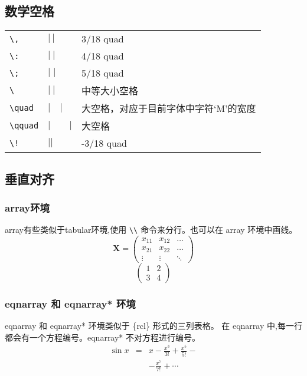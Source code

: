 \documentclass[12pt, a4paper, onecolumn, notitlepage]{article}
\begin{document}
\subsection{数学空格}
\begin{tabular}{l|l|l}
\verb-\,-     &  $|\,|$     & 3/18 quad \\
\verb-\:-     &  $|\:|$     & 4/18 quad \\
\verb-\;-     &  $|\;|$     & 5/18 quad \\
\verb*-\ -    &  $|\ |$     & 中等大小空格 \\
\verb-\quad-  &  $|\quad|$  & 大空格，对应于目前字体中字符`M'的宽度 \\
\verb-\qquad- &  $|\qquad|$ & 大空格 \\
\verb-\!-     &  $|\!|$     & -3/18 quad \\
\end{tabular}
\subsection{垂直对齐}
\subsubsection{array环境}
array有些类似于tabular环境,使用 \verb-\\- 命令来分行。也可以在 array 环境中画线。
\begin{displaymath}
\mathbf{X} =
\left( \begin{array}{ccc}
x_{11} & x_{12} & \ldots \\
x_{21} & x_{22} & \ldots \\
\vdots & \vdots & \ddots
\end{array} \right)
\end{displaymath}
\begin{displaymath}
\left(\begin{array}{c|c}
1 & 2 \\
\hline
3 & 4
\end{array}\right)
\end{displaymath}
\subsubsection{eqnarray 和 eqnarray* 环境}
eqnarray 和 eqnarray* 环境类似于 \{rcl\} 形式的三列表格。
在 eqnarray 中,每一行都会有一个方程编号。eqnarray* 不对方程进行编号。
\setlength\arraycolsep{2pt}%
\begin{eqnarray}
\sin x & = & x -\frac{x^{3}}{3!}+\frac{x^{5}}{5!}-{}\nonumber\\
       &   & -\frac{x^{7}}{7!}+\cdots
\end{eqnarray}%
\end{document}

